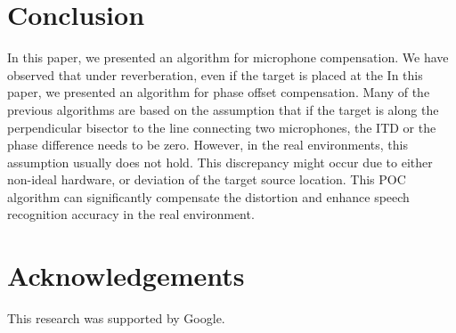 \documentclass[journal]{IEEEtran}
\begin{document}
\section{Conclusion}
In this paper, we presented an algorithm for microphone compensation.
We have observed that under reverberation, even if the target is placed
at the 
In this paper, we presented an algorithm for phase offset compensation.
Many of the previous algorithms are based on the assumption that if
the target is along the perpendicular bisector to the line connecting
two microphones, the ITD or the phase difference needs to be zero.
However, in the real environments, this assumption usually does not hold.
This discrepancy might occur due to either non-ideal hardware, or
deviation of the target source location.
This POC algorithm can significantly compensate the distortion and
enhance speech recognition accuracy in the real environment.

\section*{Acknowledgements}
This research was supported by Google. 










%
%
%

% 
\end{document}
